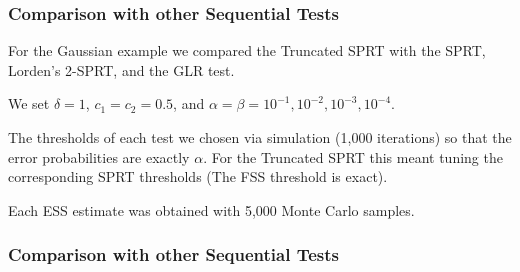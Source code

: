 \documentclass[10pt]{beamer}
\begin{document}
\begin{frame}
\frametitle{Comparison with other Sequential Tests}
For the Gaussian example we compared the Truncated SPRT with the SPRT, Lorden's 2-SPRT, and the GLR test.

We set $\delta = 1$, $c_1 = c_2 = 0.5$, and $\alpha = \beta = 10^{-1}, 10^{-2}, 10^{-3}, 10^{-4}$.

The thresholds of each test we chosen via simulation (1,000 iterations) so that the error probabilities are exactly $\alpha$. For the Truncated SPRT this meant tuning the corresponding SPRT thresholds (The FSS threshold is exact).

Each ESS estimate was obtained with 5,000 Monte Carlo samples.
\end{frame}

\begin{frame}
\frametitle{Comparison with other Sequential Tests}


\end{frame}
\end{document}
